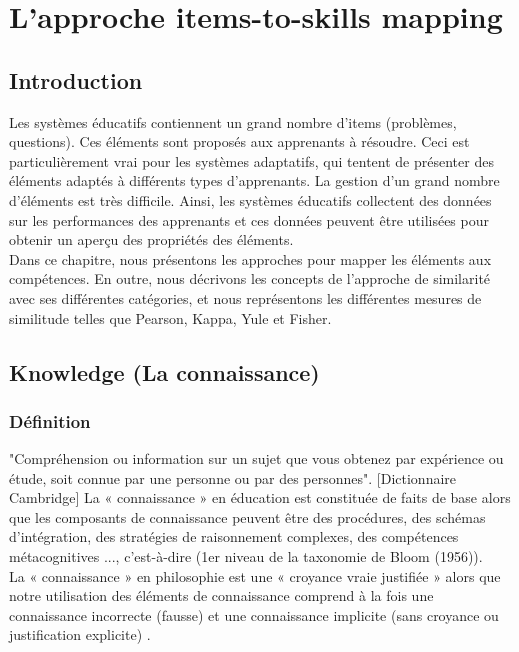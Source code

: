 \chapter{L'approche items-to-skills mapping} 
\minitoc
\thispagestyle{empty}
\newpage
\section{Introduction}
Les systèmes éducatifs contiennent un grand nombre d'items (problèmes, questions). Ces éléments sont proposés aux apprenants à résoudre. Ceci est particulièrement vrai pour les systèmes adaptatifs, qui tentent de présenter des éléments adaptés à différents types d'apprenants. La gestion d’un grand nombre d’éléments est très difficile. Ainsi, les systèmes éducatifs collectent des données sur les performances des apprenants et ces données peuvent être utilisées pour obtenir un aperçu des propriétés des éléments. \cite{pelanek2018measuring} \\
Dans ce chapitre, nous présentons les approches pour mapper les éléments aux compétences. En outre, nous décrivons les concepts de l'approche de similarité avec ses différentes catégories, et nous représentons les différentes mesures de similitude telles que Pearson, Kappa, Yule et Fisher.
\section{Knowledge (La connaissance)}
\subsection{Définition}
"Compréhension ou information sur un sujet que vous obtenez par expérience ou étude, soit connue par une personne ou par des personnes". [Dictionnaire Cambridge] La « connaissance » en éducation est constituée de faits de base alors que les composants de connaissance peuvent être des procédures, des schémas d'intégration, des stratégies de raisonnement complexes, des compétences métacognitives ..., c'est-à-dire (1er niveau de la taxonomie de Bloom (1956)). \\
La « connaissance » en philosophie est une « croyance vraie justifiée » alors que notre utilisation des éléments de connaissance comprend à la fois une connaissance incorrecte (fausse) et une connaissance implicite (sans croyance ou justification explicite) \cite{bloom1956taxonomy}.

